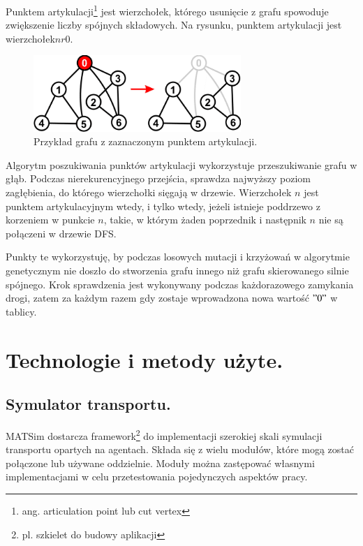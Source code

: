 \documentclass[twoside,12pt]{report}
\let\oldsection\chapter
\def\chapter{\cleardoublepage\oldsection}
\begin{document}
Punktem artykulacji\footnote{ang. articulation point lub cut vertex} jest wierzchołek, którego usunięcie z grafu spowoduje zwiększenie liczby spójnych składowych. Na rysunku, punktem artykulacji jest wierzchołek$nr 0$.

\begin{figure}[h]
\begin{center}
\includegraphics[width=0.7\textwidth]{img/articulation}
\caption{Przykład grafu z zaznaczonym punktem artykulacji.}
\end{center}
\end{figure}

Algorytm poszukiwania punktów artykulacji wykorzystuje przeszukiwanie grafu w głąb. Podczas nierekurencyjnego przejścia, sprawdza najwyższy poziom zagłębienia, do którego wierzchołki sięgają w drzewie. Wierzchołek $n$ jest punktem artykulacyjnym wtedy, i tylko wtedy, jeżeli istnieje poddrzewo z korzeniem w punkcie $n$, takie, w którym żaden poprzednik i następnik $n$ nie są połączeni w drzewie DFS. 

Punkty te wykorzystuję, by podczas losowych mutacji i krzyżowań w algorytmie genetycznym nie doszło do stworzenia grafu innego niż grafu skierowanego silnie spójnego. Krok sprawdzenia jest wykonywany podczas każdorazowego zamykania drogi, zatem za każdym razem gdy zostaje wprowadzona nowa wartość $"0"$ w tablicy.

\chapter{Technologie i metody użyte.}\label{rozdz.technologie} 
\section{Symulator transportu.}

MATSim dostarcza framework\footnote{pl. szkielet do budowy aplikacji} do implementacji szerokiej skali symulacji transportu opartych na agentach. Składa się z wielu modułów, które mogą zostać połączone lub używane oddzielnie. Moduły można zastępować własnymi implementacjami w celu przetestowania pojedynczych aspektów pracy\cite{matsim}.
\end{document}
